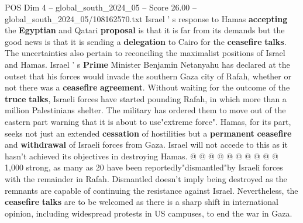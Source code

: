 \begin{textsample}{POS Dim 4 – global\_south\_2024\_05 – Score 26.00 – global\_south\_2024\_05/108162570.txt}
Israel ' s response to Hamas \textbf{accepting} the \textbf{Egyptian} and Qatari \textbf{proposal} is that it is far from its demands but the good news is that it is sending a \textbf{delegation} to Cairo for the \textbf{ceasefire} \textbf{talks}.
The uncertainties also pertain to reconciling the maximalist positions of Israel and Hamas.
Israel ' s \textbf{Prime} Minister Benjamin Netanyahu has declared at the outset that his forces would invade the southern Gaza city of Rafah, whether or not there was a \textbf{ceasefire} \textbf{agreement}.
Without waiting for the outcome of the \textbf{truce} \textbf{talks}, Israeli forces have started pounding Rafah, in which more than a million Palestinians shelter.
The military has ordered them to move out of the eastern part warning that it is about to use"extreme force".
Hamas, for its part, seeks not just an extended \textbf{cessation} of hostilities but a \textbf{permanent} \textbf{ceasefire} and \textbf{withdrawal} of Israeli forces from Gaza.
Israel will not accede to this as it hasn't achieved its objectives in destroying Hamas. @ @ @ @ @ @ @ @ @ @ 1,000 strong, as many as 20 have been reportedly"dismantled"by Israeli forces with the remainder in Rafah.
Dismantled doesn't imply being destroyed as the remnants are capable of continuing the resistance against Israel.
Nevertheless, the \textbf{ceasefire} \textbf{talks} are to be welcomed as there is a sharp shift in international opinion, including widespread protests in US campuses, to end the war in Gaza.

\end{textsample}
